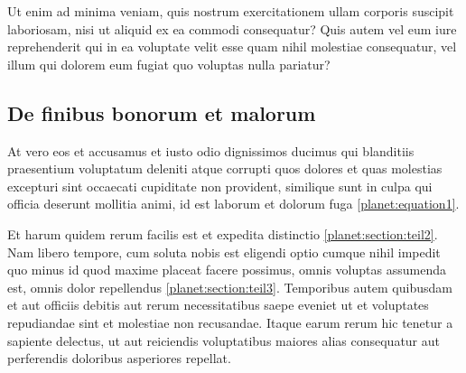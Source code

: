 Ut enim ad minima veniam, quis nostrum exercitationem ullam corporis
suscipit laboriosam, nisi ut aliquid ex ea commodi consequatur?
Quis autem vel eum iure reprehenderit qui in ea voluptate velit
esse quam nihil molestiae consequatur, vel illum qui dolorem eum
fugiat quo voluptas nulla pariatur?

\subsection{De finibus bonorum et malorum
\label{planet:subsection:finibus}}
At vero eos et accusamus et iusto odio dignissimos ducimus qui
blanditiis praesentium voluptatum deleniti atque corrupti quos
dolores et quas molestias excepturi sint occaecati cupiditate non
provident, similique sunt in culpa qui officia deserunt mollitia
animi, id est laborum et dolorum fuga \eqref{planet:equation1}.

Et harum quidem rerum facilis est et expedita distinctio
\ref{planet:section:teil2}.
Nam libero tempore, cum soluta nobis est eligendi optio cumque nihil
impedit quo minus id quod maxime placeat facere possimus, omnis
voluptas assumenda est, omnis dolor repellendus
\ref{planet:section:teil3}.
Temporibus autem quibusdam et aut officiis debitis aut rerum
necessitatibus saepe eveniet ut et voluptates repudiandae sint et
molestiae non recusandae.
Itaque earum rerum hic tenetur a sapiente delectus, ut aut reiciendis
voluptatibus maiores alias consequatur aut perferendis doloribus
asperiores repellat.


